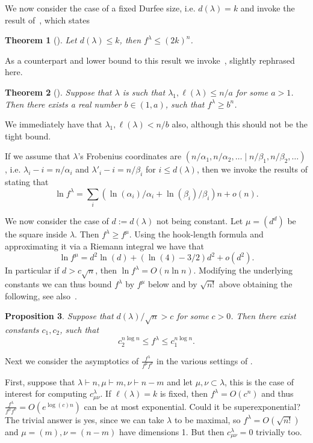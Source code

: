 \documentclass[11pt]{amsart}
\newtheorem{thm}{Theorem}[section]
\newtheorem{prop}[thm]{Proposition}
\theoremstyle{plain}
\theoremstyle{definition}
\numberwithin{equation}{section}
\newcommand{\la}{\lambda}
\def\la{\lambda}
\begin{document}
We now consider the case of a fixed Durfee size, i.e. $d(\la) =k$ and invoke the result of~\cite{regev}, which states 
\begin{thm}[\cite{regev}]
Let $d(\la) \leq k$, then $f^\la \leq (2k)^n$. 
\end{thm}

As a counterpart and lower bound to this result we invoke~\cite{GM}, slightly rephrased here.

\begin{thm}[\cite{GM}]
Suppose that $\la$ is such that $\la_1, \ell(\la) \leq n/a$ for some $a>1$. Then there exists a real number $b\in (1,a)$, such that $f^\la \geq b^n$. 
\end{thm} 
We immediately have that $\la_1,\ell(\la) <n/b$ also, although this should not be the tight bound. 

If we assume that $\la$'s Frobenius coordinates are $(n/\alpha_1 ,  n/\alpha_2 ,\ldots \mid n/ \beta_1 ,  n/\beta_2,\ldots)$, i.e. $\la_i -i = n/\alpha_i$  and $\la'_i -i=n/\beta_i $ for $i \leq d(\la)$,  then we invoke the results of \cite{MPPa} stating that
\begin{equation}\label{eq:tvk}
\ln f^\la = \sum_i\left( \ln( \alpha_i)/ \alpha_i + \ln(\beta_i)/\beta_i\right)n +o(n). 
\end{equation}
 
 We now consider the case of $d:=d(\la)$ not being constant. Let $\mu = (d^d)$ be the square inside $\la$. Then $f^\la \geq f^\mu$. Using the hook-length formula and approximating it via a Riemann integral we have that 
 $$\ln f^\mu = d^2 \ln(d) + (\ln(4)-3/2)d^2 + o(d^2).$$
 In particular if $d>c \sqrt{n}$, then $\ln f^\la = O( n\ln n)$. Modifying the underlying constants we can thus bound $f^\la$ by $f^\mu$ below and by $\sqrt{n!}$ above obtaining the following, see also~\cite{PPY}.
 \begin{prop}
 Suppose that $d(\la)/\sqrt{n}>c$ for some $c>0$. Then there exist constants $c_1,c_2$, such that 
 $$c_2^{n \log n} \leq f^\la \leq c_1^{n \log n}.$$ 
 \end{prop}  
 
 \medskip
 
Next we consider the asymptotics of $\frac{f^\la}{f^\mu f^\nu}$ in the various settings of \cite{LH24}. 

First, suppose that $\la \vdash n, \mu \vdash m, \nu \vdash n-m$ and let $\mu, \nu \subset \la$, this is the case of interest for computing $c^\la_{\mu\nu}$.  If $\ell(\la) =k$ is fixed, then $f^\la=O(c^n)$ and thus $\frac{f^\la}{f^\mu f^\nu} = O(e^{\log(c) n} )$ can be at most exponential. Could it be superexponential? The trivial answer is yes, since we can take $\la$ to be maximal, so $f^\la =O(\sqrt{n!})$ and $\mu=(m), \nu=(n-m)$ have dimensions 1. But then $c^\la_{\mu\nu}=0$ trivially too. 
\end{document}
